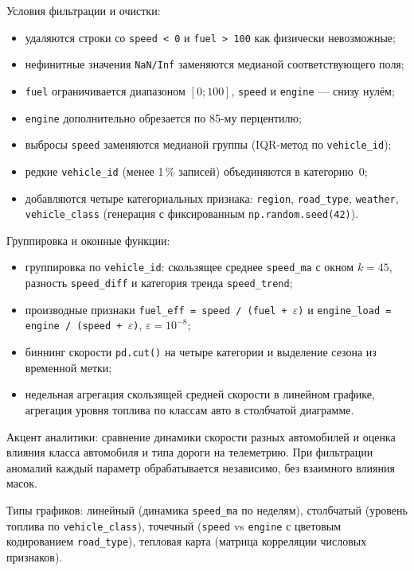 \documentclass[oneside,a4paper,14pt]{extarticle}
\begin{document}
Условия фильтрации и очистки:
\begin{itemize}[leftmargin=*]
	\item удаляются строки со \texttt{speed < 0} и \texttt{fuel > 100} как физически невозможные;
	\item нефинитные значения \texttt{NaN/Inf} заменяются медианой соответствующего поля;
	\item \texttt{fuel} ограничивается диапазоном $[0;100]$, \texttt{speed} и \texttt{engine} --- снизу нулём;
	\item \texttt{engine} дополнительно обрезается по 85-му перцентилю;
	\item выбросы \texttt{speed} заменяются медианой группы (IQR-метод по \texttt{vehicle\_id});
	\item редкие \texttt{vehicle\_id} (менее 1\,\% записей) объединяются в категорию~0;
	\item добавляются четыре категориальных признака: \texttt{region}, \texttt{road\_type}, \texttt{weather}, \texttt{vehicle\_class} (генерация с фиксированным \texttt{np.random.seed(42)}).
\end{itemize}

Группировка и оконные функции:
\begin{itemize}[leftmargin=*]
	\item группировка по \texttt{vehicle\_id}: скользящее среднее \texttt{speed\_ma} с окном $k=45$, разность \texttt{speed\_diff} и категория тренда \texttt{speed\_trend};
	\item производные признаки \texttt{fuel\_eff = speed / (fuel + $\varepsilon$)} и \texttt{engine\_load = engine / (speed + $\varepsilon$)}, $\varepsilon = 10^{-8}$;
	\item биннинг скорости \texttt{pd.cut()} на четыре категории и выделение сезона из временной метки;
	\item недельная агрегация скользящей средней скорости в линейном графике, агрегация уровня топлива по классам авто в столбчатой диаграмме.
\end{itemize}

Акцент аналитики: сравнение динамики скорости разных автомобилей и оценка влияния класса автомобиля и типа дороги на телеметрию. При фильтрации аномалий каждый параметр обрабатывается независимо, без взаимного влияния масок.

Типы графиков: линейный (динамика \texttt{speed\_ma} по неделям), столбчатый (уровень топлива по \texttt{vehicle\_class}), точечный (\texttt{speed} vs \texttt{engine} с цветовым кодированием \texttt{road\_type}), тепловая карта (матрица корреляции числовых признаков).
\end{document}
